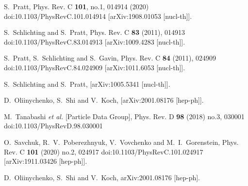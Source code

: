 \begin{thebibliography}{99}
S.~Pratt,
Phys. Rev. C \textbf{101}, no.1, 014914 (2020)
doi:10.1103/PhysRevC.101.014914
[arXiv:1908.01053 [nucl-th]].








S.~Schlichting and S.~Pratt,
Phys. Rev. C \textbf{83} (2011), 014913
doi:10.1103/PhysRevC.83.014913
[arXiv:1009.4283 [nucl-th]].

S.~Pratt, S.~Schlichting and S.~Gavin,
Phys. Rev. C \textbf{84} (2011), 024909
doi:10.1103/PhysRevC.84.024909
[arXiv:1011.6053 [nucl-th]].

S.~Schlichting and S.~Pratt,
[arXiv:1005.5341 [nucl-th]].

D.~Oliinychenko, S.~Shi and V.~Koch,
[arXiv:2001.08176 [hep-ph]].

M.~Tanabashi \textit{et al.} [Particle Data Group],
Phys. Rev. D \textbf{98} (2018) no.3, 030001
doi:10.1103/PhysRevD.98.030001

O.~Savchuk, R.~V.~Poberezhnyuk, V.~Vovchenko and M.~I.~Gorenstein,
Phys. Rev. C \textbf{101} (2020) no.2, 024917
doi:10.1103/PhysRevC.101.024917
[arXiv:1911.03426 [hep-ph]].

  D.~Oliinychenko, S.~Shi and V.~Koch,
  arXiv:2001.08176 [hep-ph].
  

\end{thebibliography}
